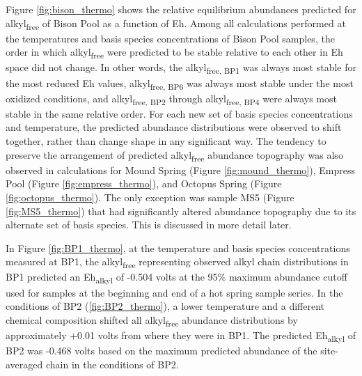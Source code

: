 Figure \ref{fig:bison_thermo} shows the relative equilibrium abundances predicted for alkyl\textsubscript{free} of Bison Pool as a function of Eh. Among all calculations performed at the temperatures and basis species concentrations of Bison Pool samples, the order in which alkyl\textsubscript{free} were predicted to be stable relative to each other in Eh space did not change. In other words, the alkyl\textsubscript{free, BP1} was always most stable for the most reduced Eh values, alkyl\textsubscript{free, BP6} was always most stable under the most oxidized conditions, and alkyl\textsubscript{free, BP2} through alkyl\textsubscript{free, BP4} were always most stable in the same relative order. For each new set of basis species concentrations and temperature, the predicted abundance distributions were observed to shift together, rather than change shape in any significant way. The tendency to preserve the arrangement of predicted alkyl\textsubscript{free} abundance topography was also observed in calculations for Mound Spring (Figure \ref{fig:mound_thermo}), Empress Pool (Figure \ref{fig:empress_thermo}), and Octopus Spring (Figure \ref{fig:octopus_thermo}). The only exception was sample MS5 (Figure \ref{fig:MS5_thermo}) that had significantly altered abundance topography due to its alternate set of basis species. This is discussed in more detail later.


In Figure \ref{fig:BP1_thermo}, at the temperature and basis species concentrations measured at BP1, the alkyl\textsubscript{free} representing observed alkyl chain distributions in BP1 predicted an Eh\textsubscript{alkyl} of -0.504 volts at the 95\% maximum abundance cutoff used for samples at the beginning and end of a hot spring sample series. In the conditions of BP2 (\ref{fig:BP2_thermo}), a lower temperature and a different chemical composition shifted all alkyl\textsubscript{free} abundance distributions by approximately +0.01 volts from where they were in BP1. The predicted Eh\textsubscript{alkyl} of BP2 was -0.468 volts based on the maximum predicted abundance of the site-averaged chain in the conditions of BP2.

